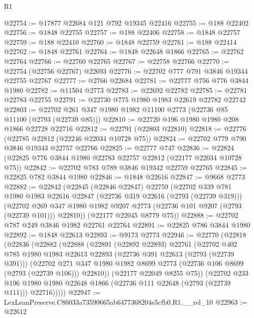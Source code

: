 \begin{lexlean}{R1}
\begin{coremodule}
@22754 := @17877 @22684 @121 @792 @19345 @22416
@22755 := @188 @22402
@22756 := @1848 @22755
@22757 := @188 @22406
@22758 := @1848 @22757
@22759 := @188 @22410
@22760 := @1848 @22759
@22761 := @188 @22414
@22762 := @1848 @22761
@22764 := @1848 @22648 @1866
@22765 := @22762 @22764
@22766 := @22760 @22765
@22767 := @22758 @22766
@22770 := @22754 (@22756 @22767) @22693
@22776 := @22702 @777 @791 @3846 @19344 @22755 @22767
@22777 := @2766 @22684
@22781 := @22777 @756 @776 @3844 @1980
@22782 := @11504 @2773
@22783 := @22692 @22782
@22785 := @22781 @22783 @22755
@22791 := @22730 @775 @1980 @1983 @22619 @22782 @22742
@22803 := @22702 @261 @347 @1980 @1982 @11100 @2773 (@22736 @85 @11100 (@2793 (@22739 @85)))
@22810 := @22720 @196 @1980 @1980 @208 @1866 @22728 @22716
@22812 := @22791 (@22803 @22810)
@22818 := @22776 (@22785 @22812 (@22246 @22034 @10728 @75))
@22824 := @22702 @779 @790 @3846 @19343 @22757 @22766
@22825 := @22777 @747
@22836 := @22824 (@22825 @776 @3844 @1980 @22783 @22757 @22812 (@22177 @22034 @10728 @75))
@22842 := @22702 @783 @789 @3846 @19342 @22759 @22765
@22845 := @22825 @782 @3844 @1980
@22846 := @1848 @22616
@22847 := @9668 @2773
@22882 := @22842
    (@22845
      (@22846 @22847)
      @22759
      (@22702
        @339
        @781
        @1980
        @1983
        @22616
        @22847
        (@22736 @319 @22616 (@2793 (@22739 @319)))
        (@22702 @269 @347 @1980 @1982 @9207 @2773 (@22736 @101 @9207 (@2793 (@22739 @101))) @22810))
      (@22177 @22045 @8779 @75))
@22888 := @22702 @787 @249 @3846 @1982 @22761 @22764
@22891 := @22825 @786 @3844 @1980
@22892 := @1848 @22613
@22893 := @9173 @2773
@22946 := @22770
    (@22818
      (@22836
        (@22882
          (@22888
            (@22891
              (@22892 @22893)
              @22761
              (@22702
                @402
                @785
                @1980
                @1983
                @22613
                @22893
                (@22736 @391 @22613 (@2793 (@22739 @391)))
                (@22702
                  @271
                  @347
                  @1980
                  @1982
                  @8699
                  @2773
                  (@22736 @106 @8699 (@2793 (@22739 @106)))
                  @22810))
              (@22177 @22049 @8255 @75))
            (@22702
              @233
              @196
              @1980
              @1980
              @22648
              @1866
              (@22736 @111 @22648 (@2793 (@22739 @111)))
              @22716)))))
@22947 := LexLeanPreserve.C86033a73590665ab6477368204e5cfb0.R1.__rel_10
@22963 := @22612

\end{coremodule}
\end{lexlean}
